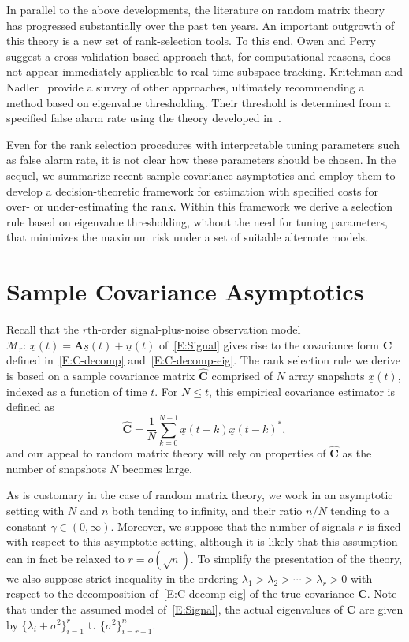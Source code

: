 \documentclass[final]{IEEEtran} %
\newcommand{\vectorsymbol}{\underline}
\newcommand{\matrixsymbol}{\boldsymbol}
\newcommand{\mA}{\matrixsymbol{A}}
\newcommand{\mC}{\matrixsymbol{C}}
\newcommand{\mhC}{\widehat{\matrixsymbol{C}}}
\newcommand{\vn}{\vectorsymbol{n}}
\newcommand{\vs}{\vectorsymbol{s}}
\newcommand{\vx}{\vectorsymbol{x}}
\begin{document}
In parallel to the above developments, the literature on random matrix theory
has progressed substantially over the past ten years. An important outgrowth of this theory is
a new set of rank-selection tools.  To this end, Owen and Perry~\cite{owen2009bcv} suggest a
cross-validation-based approach that, for computational reasons, does not appear immediately applicable to real-time subspace tracking. Kritchman and
Nadler~\cite{kritchman2008dnc} provide a survey of other approaches,
ultimately recommending a method based on eigenvalue thresholding. %
Their threshold is determined from a specified false alarm rate using the
theory developed in~\cite{johansson2000sfa, johnstone2001dle, baik2005pto, baik2006els, paul2007ase, onatski2007adp}.

Even for the rank selection procedures with interpretable tuning parameters such as false alarm rate, it is not clear how these parameters should be chosen.  In the sequel, we summarize recent sample covariance asymptotics and employ them to develop a decision-theoretic framework for estimation with specified costs for over- or under-estimating the rank.  Within this framework we derive a selection rule based on eigenvalue thresholding, without the need for tuning parameters, that minimizes the maximum risk under a set of suitable alternate models.

\section{Sample Covariance Asymptotics}%
\label{S:null-alt-rmt}

Recall that the $r$th-order signal-plus-noise observation model $\mathcal{M}_r\!:\, \vx(t) = \mA \vs(t) + \vn(t)$ of~\eqref{E:Signal} gives rise to the covariance form $\mC$ defined in~\eqref{E:C-decomp} and~\eqref{E:C-decomp-eig}.  The rank selection rule we derive is based on a sample covariance matrix $\mhC$ comprised of $N$ array snapshots $\vx(t)$, indexed as a function of time $t$.  For $N \leq t$, this empirical covariance estimator is defined as
\begin{equation}\label{E:C-empirical}
    \mhC = \frac{1}{N} \sum_{k=0}^{N-1} \vx(t-k) \vx(t-k)^*,
\end{equation}
and our appeal to random matrix theory will rely on properties of $\mhC$ as the number of snapshots $N$ becomes large.

As is customary in the case of random matrix theory, we work in an asymptotic setting with $N$ and $n$ both tending to infinity, and their ratio $n/N$ tending to a constant $\gamma \in (0,\infty)$.  Moreover, we suppose that the number of signals $r$ is fixed with respect to this asymptotic setting, although it is likely that this assumption can in fact be relaxed to $r = o(\sqrt{n})$.  To simplify the presentation of the theory, we also suppose strict inequality in the ordering
$\lambda_1 > \lambda_2 > \cdots > \lambda_r > 0$ with respect to the decomposition of~\eqref{E:C-decomp-eig} of the true covariance $\mC$.  Note that under the assumed model of~\eqref{E:Signal}, the actual eigenvalues of $\mC$ are given by $\{\lambda_i+\sigma^2\}_{i=1}^r \,\cup\, \{\sigma^2\}_{i=r+1}^n$.
\end{document}
